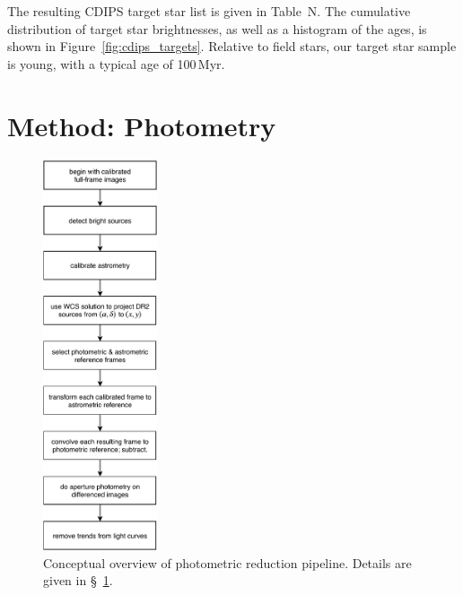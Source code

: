 \documentclass[12pt,twocolumn,tighten]{aastex62}
\begin{document}
The resulting CDIPS target star list is given in Table~N.
The cumulative distribution of target star brightnesses, as well as a
histogram of the ages, is shown in Figure~\ref{fig:cdips_targets}.
Relative to field stars, our target star sample is young, with a
typical age of 100$\,$Myr.






\section{Method: Photometry}
\label{sec:method}

\begin{figure}[!t]
	\begin{center}
		\leavevmode
		\includegraphics[width=0.3\textwidth]{pipelineoverview.pdf}
	\end{center}
	\vspace{-0.2cm}
	\caption{
    Conceptual overview of photometric reduction pipeline.
    Details are given in \S~\ref{sec:method}.
	\label{fig:pipeline}
	}
\end{figure}
\end{document}
